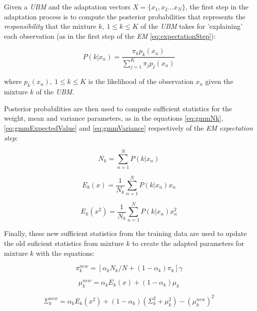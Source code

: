 Given a \textit{UBM} and the adaptation vectors $X=\{x_{1}, x_{2} \dotsc x_{N}\}$, the first step
in the adaptation process is to compute the posterior probabilities that represents the
\textit{responsibility} that the mixture $k, \ 1 \leq k \leq K$ of the \textit{UBM}
takes for 'explaining' each observation
(as in the first step of the \textit{EM} \ref{eq:expectationStep}):

\begin{equation}
P(k|x_{n}) = \frac{\pi_{k}p_{k}(x_{n})}{\sum_{j=1}^{K}\pi_{j}p_{j}(x_{n})}
\end{equation}

where $p_{k}(x_{n}), \ 1 \leq k \leq K$ is the likelihood of the observation $x_{n}$ given the
mixture $k$ of the \textit{UBM}.

Posterior probabilities are then used to compute sufficient statistics for the weight, mean
and variance parameters, as in the equations \ref{eq:gmmNk}, \ref{eq:gmmExpectedValue} and \ref{eq:gmmVariance} respectively of the \textit{EM expectation step}:

\begin{equation}
	N_{k} = \sum_{n=1}^{N}P(k|x_{n})
\end{equation}

\begin{equation}
	E_{k}(x) = \frac{1}{N_{k}}\sum_{n=1}^{N}P(k|x_{n})x_{n}
\end{equation}

\begin{equation}
	E_{k}(x^{2}) = \frac{1}{N_{k}}\sum_{n=1}^{N}P(k|x_{n})x_{n}^{2}
\end{equation}

Finally, these new sufficient statistics from the training data are used to update the old
suficient statistics from mixture $k$ to create the adapted parameters for mixture $k$ with
the equations:

\begin{equation}
	\pi_{k}^{new} = [\alpha_{k} N_{k} / N + (1-\alpha_{k}) \pi_{k}]\gamma
\end{equation}

\begin{equation}
	\mu_{k}^{new}	= \alpha_{k} E_{k}(x) + (1-\alpha_{k})\mu_{k}
\end{equation}

\begin{equation}
	\Sigma_{k}^{new} = \alpha_{k} E_{k}(x^{2}) + (1-\alpha_{k})(\Sigma_{k}^{2} + \mu_{k}^{2}) - (\mu_{k}^{new})^{2}
\end{equation}

